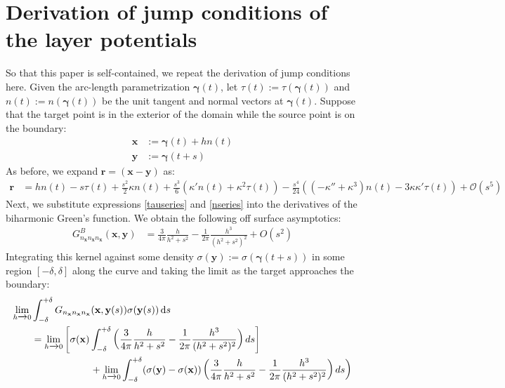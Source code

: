 \documentclass[preprint,12pt,3p]{elsarticle}
\newcommand{\dd}{ {\rm d} }
\begin{document}
\section{Derivation of jump conditions of the layer potentials}

So that this paper is self-contained, we repeat the derivation of jump conditions here. Given the arc-length parametrization $\pmb{\gamma}(t)$, let $\tau(t) := \tau(\pmb{\gamma}(t)) $ and $n(t) := n(\pmb{\gamma}(t)) $ be the unit tangent and normal vectors at $\pmb{\gamma}(t)$. Suppose that the target point is in the exterior of the domain while the source point is on the boundary:
\begin{align}
    \mathbf{x} &:= \pmb{\gamma}(t) + h n(t) \\
    \mathbf{y} &:= \pmb{\gamma}(t+s) 
\end{align}
As before, we expand $\pmb{r} =(\mathbf{x} - \mathbf{y})$ as:
\begin{align}
    \pmb{r} &= h n(t) - s \tau(t) + \frac{s^2}{2} \kappa n(t)  + \frac{s^3}{6}(\kappa' n(t) + \kappa^2 \tau(t) ) - \frac{s^4}{24} ((-\kappa'' + \kappa^3)n(t) - 3\kappa\kappa'\tau(t)) + \mathcal{O}(s^5) \label{rseries}
\end{align}
Next, we substitute expressions \eqref{tauseries} and \eqref{nseries} into the derivatives of the biharmonic Green's function. We obtain the following off surface asymptotics:
\begin{align}
    G^B_{n_\mathbf{x} n_\mathbf{x} n_\mathbf{x}}(\mathbf{x},\mathbf{y}) &=  \frac{3}{4 \pi} \frac{h}{h^2 + s^2} - \frac{1}{2\pi} \frac{h^3}{(h^2 + s^2)^2} + O(s^2) 
\end{align}
Integrating this kernel against some density $\sigma(\mathbf{y}) := \sigma(\pmb{\gamma}(t+s))$ in some region $[-\delta, \delta]$ along the curve and taking the limit as the target approaches the boundary:
\begin{align}
    \lim_{h \xrightarrow{} 0}  & \int^{+\delta}_{-\delta}   G_{n_\mathbf{x} n_\mathbf{x} n_\mathbf{x}}(\mathbf{x}, \mathbf{y}(s)) \sigma(\mathbf{y}(s)) \, \dd s \\
    &= \lim_{h \xrightarrow{} 0}  \left[ \sigma(\mathbf{x}) \int^{+\delta}_{-\delta} \left(  \frac{3}{4 \pi} \frac{h}{h^2 + s^2} - \frac{1}{2\pi} \frac{h^3}{(h^2 + s^2)^2} \right) ds \right] \label{jumpintegral1} \\
    &\qquad \qquad \qquad +  \lim_{h \xrightarrow{} 0}  \int^{+\delta}_{-\delta} (\sigma(\mathbf{y}) - \sigma(\mathbf{x}))  \left(  \frac{3}{4 \pi} \frac{h}{h^2 + s^2} - \frac{1}{2\pi} \frac{h^3}{(h^2 + s^2)^2} \right)  ds \bigg) \label{jumpintegral2} 
\end{align}
\end{document}
